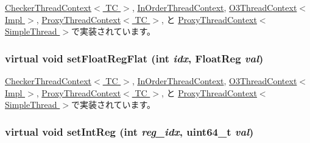 \hyperlink{classCheckerThreadContext_acd974292ff0461c2e94c0b5a1126b503}{CheckerThreadContext$<$ TC $>$}, \hyperlink{classInOrderThreadContext_acd974292ff0461c2e94c0b5a1126b503}{InOrderThreadContext}, \hyperlink{classO3ThreadContext_acd974292ff0461c2e94c0b5a1126b503}{O3ThreadContext$<$ Impl $>$}, \hyperlink{classProxyThreadContext_acd974292ff0461c2e94c0b5a1126b503}{ProxyThreadContext$<$ TC $>$}, と \hyperlink{classProxyThreadContext_acd974292ff0461c2e94c0b5a1126b503}{ProxyThreadContext$<$ SimpleThread $>$}で実装されています。\hypertarget{classThreadContext_a01392cdc362f9d589f90e57bcc519623}{
\subsubsection[{setFloatRegFlat}]{\setlength{\rightskip}{0pt plus 5cm}virtual void setFloatRegFlat (int {\em idx}, \/  {\bf FloatReg} {\em val})}}
\label{classThreadContext_a01392cdc362f9d589f90e57bcc519623}


\hyperlink{classCheckerThreadContext_a71ec23ca2c029120932e5af4babc0da1}{CheckerThreadContext$<$ TC $>$}, \hyperlink{classInOrderThreadContext_a71ec23ca2c029120932e5af4babc0da1}{InOrderThreadContext}, \hyperlink{classO3ThreadContext_a71ec23ca2c029120932e5af4babc0da1}{O3ThreadContext$<$ Impl $>$}, \hyperlink{classProxyThreadContext_a71ec23ca2c029120932e5af4babc0da1}{ProxyThreadContext$<$ TC $>$}, と \hyperlink{classProxyThreadContext_a71ec23ca2c029120932e5af4babc0da1}{ProxyThreadContext$<$ SimpleThread $>$}で実装されています。\hypertarget{classThreadContext_a995ac11ab79af59e135d473df10c72da}{
\subsubsection[{setIntReg}]{\setlength{\rightskip}{0pt plus 5cm}virtual void setIntReg (int {\em reg\_\-idx}, \/  uint64\_\-t {\em val})}}
\label{classThreadContext_a995ac11ab79af59e135d473df10c72da}


